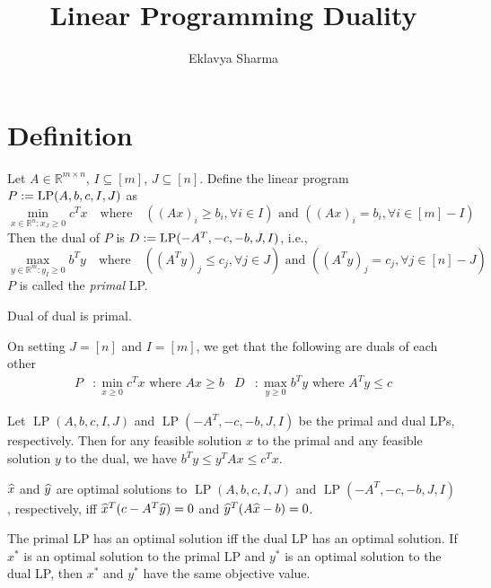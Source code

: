 \documentclass[a4paper,12pt,fleqn]{article}
\author{Eklavya Sharma}
\date{\empty}
\title{Linear Programming Duality}
\DeclareMathOperator{\LP}{LP}
\begin{document}
\maketitle
\setlength{\parskip}{0.2em}

\section{Definition}

Let $A \in \mathbb{R}^{m \times n}$, $I \subseteq [m]$, $J \subseteq [n]$.
Define the linear program $P \defeq \LP(A, b, c, I, J)$ as
\[ \min_{x \in \mathbb{R}^n: x_J \ge 0} c^Tx \quad\textrm{where}\quad
((Ax)_i \ge b_i, \forall i \in I) \textrm{ and } ((Ax)_i = b_i, \forall i \in [m]-I) \]
Then the dual of $P$ is $D \defeq \LP(-A^T, -c, -b, J, I)$, i.e.,
\[ \max_{y \in \mathbb{R}^m: y_I \ge 0} b^Ty \quad\textrm{where}\quad
((A^Ty)_j \le c_j, \forall j \in J) \textrm{ and } ((A^Ty)_j = c_j, \forall j \in [n]-J) \]
$P$ is called the \emph{primal} LP.

\begin{lemma}
Dual of dual is primal.
\end{lemma}

On setting $J = [n]$ and $I = [m]$, we get that the
following are duals of each other
\begin{align*}
P &: \min_{x \ge 0} c^Tx \textrm{ where } Ax \ge b
& D&: \max_{y \ge 0} b^Ty \textrm{ where } A^Ty \le c
\end{align*}

\begin{theorem}
Let $\LP(A, b, c, I, J)$ and $\LP(-A^T, -c, -b, J, I)$ be the primal and dual LPs, respectively.
Then for any feasible solution $x$ to the primal and any feasible solution $y$ to the dual,
we have $b^Ty \le y^T\!Ax \le c^Tx$.
\end{theorem}

\begin{corollary}
$\widehat{x}$ and $\widehat{y}$ are optimal solutions to $\LP(A, b, c, I, J)$ and $\LP(-A^T, -c, -b, J, I)$, respectively,
iff $\widehat{x}^T(c - A^T\widehat{y}) = 0$ and $\widehat{y}^T(A\widehat{x} - b) = 0$.
\end{corollary}

\begin{theorem}
The primal LP has an optimal solution iff the dual LP has an optimal solution.
If $x^*$ is an optimal solution to the primal LP and $y^*$ is an optimal solution to the dual LP,
then $x^*$ and $y^*$ have the same objective value.
\end{theorem}
\end{document}

